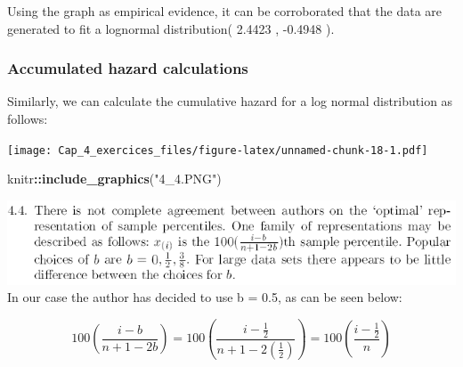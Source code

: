 \documentclass[
]{article}
\newenvironment{Shaded}{\begin{snugshade}}{\end{snugshade}}
\newcommand{\DataTypeTok}[1]{\textcolor[rgb]{0.13,0.29,0.53}{#1}}
\newcommand{\DecValTok}[1]{\textcolor[rgb]{0.00,0.00,0.81}{#1}}
\newcommand{\FloatTok}[1]{\textcolor[rgb]{0.00,0.00,0.81}{#1}}
\newcommand{\KeywordTok}[1]{\textcolor[rgb]{0.13,0.29,0.53}{\textbf{#1}}}
\newcommand{\NormalTok}[1]{#1}
\newcommand{\OperatorTok}[1]{\textcolor[rgb]{0.81,0.36,0.00}{\textbf{#1}}}
\newcommand{\StringTok}[1]{\textcolor[rgb]{0.31,0.60,0.02}{#1}}
\begin{document}
Using the graph as empirical evidence, it can be corroborated that the
data are generated to fit a lognormal distribution( 2.4423 , -0.4948 ).

\hypertarget{accumulated-hazard-calculations}{%
\subsubsection{Accumulated hazard
calculations}\label{accumulated-hazard-calculations}}

Similarly, we can calculate the cumulative hazard for a log normal
distribution as follows:

\begin{Shaded}
\end{Shaded}

\texttt{[image: Cap\_4\_exercices\_files/figure-latex/unnamed-chunk-18-1.pdf]}

\begin{Shaded}
\begin{Highlighting}[]
\NormalTok{knitr}\OperatorTok{::}\KeywordTok{include_graphics}\NormalTok{(}\StringTok{"4_4.PNG"}\NormalTok{)}
\end{Highlighting}
\end{Shaded}

\includegraphics[width=9.22in]{4_4} In our case the author has decided
to use b = 0.5, as can be seen below:

\[100\left(\frac{i-b}{n+1-2b}\right)=100\left(\frac{i-\frac{1}{2}}{n+1-2\left(\frac{1}{2}\right)}\right)=100\left(\frac{i-\frac{1}{2}}{n}\right)\]
\end{document}
